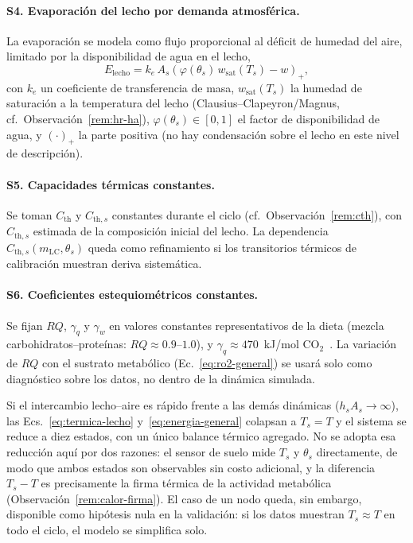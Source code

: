 \paragraph{S4. Evaporaci\'on del lecho por demanda atmosf\'erica.} La evaporaci\'on se modela como flujo proporcional al d\'eficit de humedad del aire, limitado por la disponibilidad de agua en el lecho,
\begin{equation}
E_{\mathrm{lecho}} = k_e\, A_s \left( \varphi(\theta_s)\, w_{\mathrm{sat}}(T_s) - w \right)_+,
\label{eq:evap-simplificada}
\end{equation}
con $k_e$ un coeficiente de transferencia de masa, $w_{\mathrm{sat}}(T_s)$ la humedad de saturaci\'on a la temperatura del lecho (Clausius--Clapeyron/Magnus, cf.~Observaci\'on~\ref{rem:hr-ha}), $\varphi(\theta_s) \in [0,1]$ el factor de disponibilidad de agua, y $(\cdot)_+$ la parte positiva (no hay condensaci\'on sobre el lecho en este nivel de descripci\'on).

\paragraph{S5. Capacidades t\'ermicas constantes.} Se toman $C_{\mathrm{th}}$ y $C_{\mathrm{th},s}$ constantes durante el ciclo (cf.~Observaci\'on~\ref{rem:cth}), con $C_{\mathrm{th},s}$ estimada de la composici\'on inicial del lecho. La dependencia $C_{\mathrm{th},s}(m_{\mathrm{LC}}, \theta_s)$ queda como refinamiento si los transitorios t\'ermicos de calibraci\'on muestran deriva sistem\'atica.

\paragraph{S6. Coeficientes estequiom\'etricos constantes.} Se fijan $RQ$, $\gamma_q$ y $\gamma_w$ en valores constantes representativos de la dieta (mezcla carbohidratos--prote\'inas: $RQ \approx 0.9$--$1.0$), y $\gamma_q \approx 470$~kJ/mol CO$_2$~\citep{hansenUseCalorespirometricRatios2004,lightonMeasuringMetabolicRates2008}. La variaci\'on de $RQ$ con el sustrato metab\'olico (Ec.~\eqref{eq:ro2-general}) se usar\'a solo como diagn\'ostico sobre los datos, no dentro de la din\'amica simulada.

\begin{remark}
\label{rem:un-nodo}
Si el intercambio lecho--aire es r\'apido frente a las dem\'as din\'amicas ($h_s A_s \to \infty$), las Ecs.~\eqref{eq:termica-lecho} y~\eqref{eq:energia-general} colapsan a $T_s = T$ y el sistema se reduce a diez estados, con un \'unico balance t\'ermico agregado. No se adopta esa reducci\'on aqu\'i por dos razones: el sensor de suelo mide $T_s$ y $\theta_s$ directamente, de modo que ambos estados son observables sin costo adicional, y la diferencia $T_s - T$ es precisamente la firma t\'ermica de la actividad metab\'olica (Observaci\'on~\ref{rem:calor-firma}). El caso de un nodo queda, sin embargo, disponible como hip\'otesis nula en la validaci\'on: si los datos muestran $T_s \approx T$ en todo el ciclo, el modelo se simplifica solo.
\end{remark}

